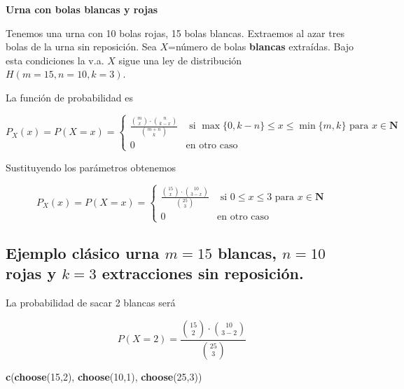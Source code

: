 \documentclass[]{book}
\newenvironment{Shaded}{\begin{snugshade}}{\end{snugshade}}
\newcommand{\DecValTok}[1]{\textcolor[rgb]{0.00,0.00,0.81}{#1}}
\newcommand{\KeywordTok}[1]{\textcolor[rgb]{0.13,0.29,0.53}{\textbf{#1}}}
\newcommand{\NormalTok}[1]{#1}
\begin{document}
\textbf{Urna con bolas blancas y rojas}

Tenemos una urna con 10 bolas rojas, 15 bolas blancas. Extraemos al azar tres bolas de la urna sin reposición. Sea \(X\)=número de bolas \textbf{blancas} extraídas. Bajo esta condiciones la v.a. \(X\) sigue una ley de distribución \(H(m=15,n=10,k=3)\).

La función de probabilidad es

\[
P_X(x)=P(X=x)=\left\{
\begin{array}{ll}
\frac{\binom{m}{x}\cdot \binom{n}{k-x}}{\binom{m+n}{k}} & \mbox{ si }
\max\{0,k-n\}\leq x \leq \min\{m,k\} \mbox { para  } x\in \mathbf{N}\\
0  & \mbox{en otro caso}\end{array}\right.
\]

Sustituyendo los parámetros obtenemos

\[
P_X(x)=P(X=x)=\left\{
\begin{array}{ll}
\frac{\binom{15}{x}\cdot \binom{10}{3-x}}{\binom{25}{3}} & \mbox{ si }
0\leq x \leq 3 \mbox { para  } x\in \mathbf{N}\\
0  & \mbox{en otro caso}\end{array}\right.
\]

\hypertarget{ejemplo-cluxe1sico-urna-m15-blancas-n10-rojas-y-k3-extracciones-sin-reposiciuxf3n.-1}{%
\subsection{\texorpdfstring{Ejemplo clásico urna \(m=15\) blancas, \(n=10\) rojas y \(k=3\) extracciones sin reposición.}{Ejemplo clásico urna m=15 blancas, n=10 rojas y k=3 extracciones sin reposición.}}\label{ejemplo-cluxe1sico-urna-m15-blancas-n10-rojas-y-k3-extracciones-sin-reposiciuxf3n.-1}}

La probabilidad de sacar 2 blancas será

\[
P(X=2)=\frac{\binom{15}{2}\cdot \binom{10}{3-2}}{\binom{25}{3}}
\]

\begin{Shaded}
\begin{Highlighting}[]
\KeywordTok{c}\NormalTok{(}\KeywordTok{choose}\NormalTok{(}\DecValTok{15}\NormalTok{,}\DecValTok{2}\NormalTok{), }\KeywordTok{choose}\NormalTok{(}\DecValTok{10}\NormalTok{,}\DecValTok{1}\NormalTok{), }\KeywordTok{choose}\NormalTok{(}\DecValTok{25}\NormalTok{,}\DecValTok{3}\NormalTok{))}
\end{Highlighting}
\end{Shaded}
\end{document}
